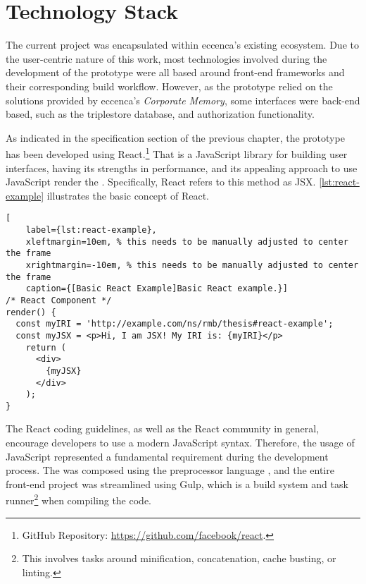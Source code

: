 \section{Technology Stack}\label{sec:TechStack}

The current project was encapsulated within eccenca’s existing ecosystem. Due to the user-centric nature of this work, most technologies involved during the development of the prototype were all based around front-end frameworks and their corresponding build workflow. However, as the prototype relied on the solutions provided by eccenca’s \textit{Corporate Memory}, some interfaces were back-end based, such as the triplestore database, and authorization functionality.

As indicated in the specification section of the previous chapter, the prototype has been developed using React.\footnote{GitHub Repository: \url{https://github.com/facebook/react}.} That is a JavaScript library for building user interfaces, having its strengths in performance, and its appealing approach to use JavaScript render the  . Specifically, React refers to this method as \acrfull*{JSX}. \autoref{lst:react-example} illustrates the basic concept of React.

\begin{spacing}{0.9}
    \lstset{language=JavaScript}
    \begin{lstlisting}[
    label={lst:react-example},
    xleftmargin=10em, % this needs to be manually adjusted to center the frame
    xrightmargin=-10em, % this needs to be manually adjusted to center the frame
    caption={[Basic React Example]Basic React example.}]
/* React Component */
render() {
  const myIRI = 'http://example.com/ns/rmb/thesis#react-example';
  const myJSX = <p>Hi, I am JSX! My IRI is: {myIRI}</p>
    return (
      <div>
        {myJSX}
      </div>
    );
}
    \end{lstlisting}
\end{spacing}

\noindent The React coding guidelines, as well as the React community in general, encourage developers to use a modern JavaScript syntax. Therefore, the usage of JavaScript represented a fundamental requirement during the development process. The  was composed using the preprocessor language , and the entire front-end project was streamlined using Gulp, which is a build system and task runner\footnote{This involves tasks around minification, concatenation, cache busting, or linting.} when compiling the code.  

